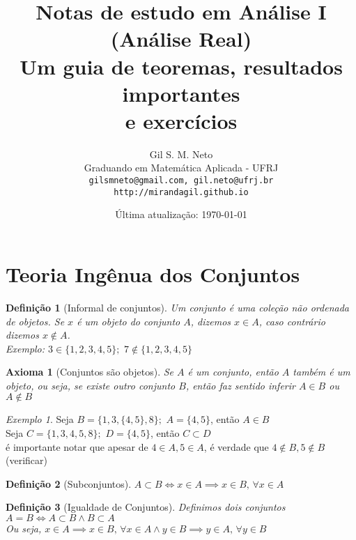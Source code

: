 \documentclass{article}
\title{Notas de estudo em Análise I (Análise Real)\\ Um guia de teoremas, resultados importantes\\ e exercícios}
\author{
  Gil S. M. Neto\\
  Graduando em Matemática Aplicada - UFRJ\\
  \texttt{gilsmneto@gmail.com, gil.neto@ufrj.br}\\
  \texttt{http://mirandagil.github.io}
}
\date{Última atualização: \today}
\theoremstyle{plain}
\newtheorem{axm}{Axioma}
\newtheorem{defn}{Definição}
\theoremstyle{remark}
\newtheorem*{ex}{Exemplo}
\numberwithin{equation}{section}
\numberwithin{thm}{section}
\numberwithin{defn}{section}
\numberwithin{lemma}{section}
\numberwithin{axm}{section}
\begin{document}
\maketitle

\tableofcontents
\newpage

\section{Teoria Ingênua dos Conjuntos}

\begin{defn}[Informal de conjuntos]\label{def1:1}
Um conjunto é uma coleção não ordenada de objetos. Se \(x\) é um objeto do conjunto \(A\), dizemos \(x \in A\), caso contrário dizemos \(x \not\in A\). \\
Exemplo: \(3 \in \{1,2,3,4,5\}; \, \, 7 \not\in \{1,2,3,4,5\}\)
\end{defn}

	\begin{axm} [Conjuntos são objetos]\label{axm1:1}
		Se \(A\) é um conjunto, então \(A\) também é um objeto, ou seja, se existe outro conjunto \(B\), então faz sentido inferir \(A \in B\) ou \(A \not\in B\)
\end{axm}

\begin{ex}
Seja \(B = \{ 1, 3, \{4, 5\}, 8 \}; \,\, A = \{4,5\}\), então \(A \in B\)\\
Seja \(C = \{ 1, 3, 4, 5, 8 \}; \,\, D = \{4,5\}\), então \(C \subset D\)\\
é importante notar que apesar de \(4 \in A, 5 \in A\), é verdade que \(4 \not\in B, 5 \not\in B\) (verificar)
\end{ex}

\begin{defn}[Subconjuntos]\label{def1:2}
  \(A \subset B \iff x \in A \implies x \in B, \, \forall x \in A\)
\end{defn}

\begin{defn}[Igualdade de Conjuntos] \label{def1:3}
Definimos dois conjuntos \(A = B \iff A \subset B \wedge B \subset A\)\\
Ou seja, \(x \in A \implies x \in B, \, \forall x \in A \wedge y \in B \implies y \in A, \, \forall y \in B\)
\end{defn}
\end{document}
